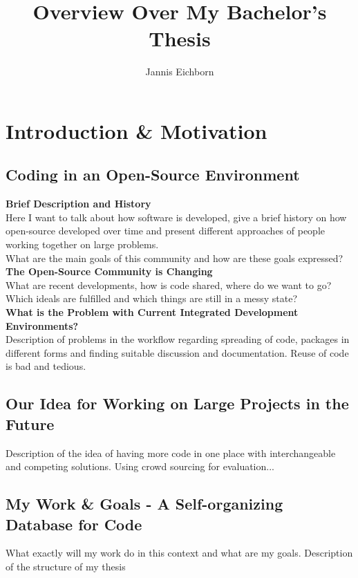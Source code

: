 \documentclass[12p]{scrartcl}
\title{Overview Over My Bachelor's Thesis}
\author{Jannis Eichborn}
\begin{document}
\begin{titlepage}
\maketitle
\tableofcontents
\end{titlepage}

\section{Introduction \& Motivation}
\subsection{Coding in an Open-Source Environment}

\textbf{Brief Description and History}\\
Here I want to talk about how software is developed, give a brief history on how open-source developed over time and present different approaches of people working together on large problems.\\
What are the main goals of this community and how are these goals expressed?\\

\textbf{The Open-Source Community is Changing}\\
What are recent developments, how is code shared, where do we want to go?
Which ideals are fulfilled and which things are still in a messy state?\\

\textbf{What is the Problem with Current Integrated Development Environments?}\\
Description of problems in the workflow regarding spreading of code, packages in different forms and finding suitable discussion and documentation. Reuse of code is bad and tedious.

\subsection{Our Idea for Working on Large Projects in the Future}
Description of the idea of having more code in one place with interchangeable and competing solutions. Using crowd sourcing for evaluation...

\subsection{My Work \& Goals - A Self-organizing Database for Code}
What exactly will my work do in this context and what are my goals. 
Description of the structure of my thesis
\end{document}
